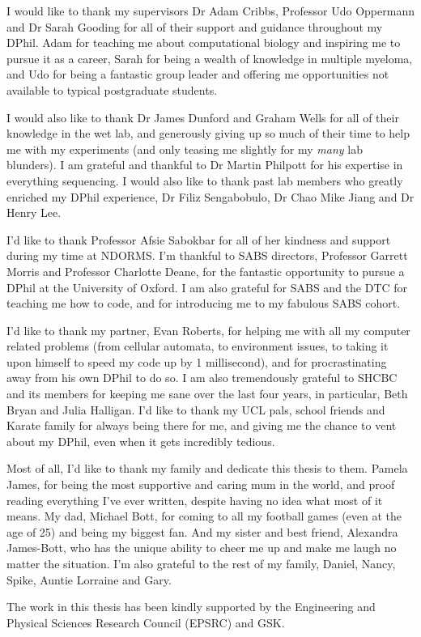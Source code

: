 I would like to thank my supervisors Dr Adam Cribbs, Professor Udo Oppermann and Dr Sarah Gooding for all of their support and guidance throughout my DPhil.
Adam for teaching me about computational biology and inspiring me to pursue it as a career, Sarah for being a wealth of knowledge in multiple myeloma, and Udo for being a fantastic group leader and offering me opportunities not available to typical postgraduate students.  

I would also like to thank Dr James Dunford and Graham Wells for all of their knowledge in the wet lab, and generously giving up so much of their time to help me with my experiments (and only teasing me slightly for my \textit{many} lab blunders).
I am grateful and thankful to Dr Martin Philpott for his expertise in everything sequencing.
I would also like to thank past lab members who greatly enriched my DPhil experience, Dr Filiz Sengabobulo, Dr Chao Mike Jiang and Dr Henry Lee.

I'd like to thank Professor Afsie Sabokbar for all of her kindness and support during my time at NDORMS. 
I'm thankful to SABS directors, Professor Garrett Morris and Professor Charlotte Deane, for the fantastic opportunity to pursue a DPhil at the University of Oxford. 
I am also grateful for SABS and the DTC for teaching me how to code, and for introducing me to my fabulous SABS cohort. 

I'd like to thank my partner, Evan Roberts, for helping me with all my computer related problems (from cellular automata, to environment issues, to taking it upon himself to speed my code up by 1 millisecond), and for procrastinating away from his own DPhil to do so. 
I am also tremendously grateful to SHCBC and its members for keeping me sane over the last four years, in particular, Beth Bryan and Julia Halligan.
I'd like to thank my UCL pals, school friends and Karate family for always being there for me, and giving me the chance to vent about my DPhil, even when it gets incredibly tedious. 

Most of all, I'd like to thank my family and dedicate this thesis to them.
Pamela James, for being the most supportive and caring mum in the world, and proof reading everything I've ever written, despite having no idea what most of it means.
My dad, Michael Bott, for coming to all my football games (even at the age of 25) and being my biggest fan.
And my sister and best friend, Alexandra James-Bott, who has the unique ability to cheer me up and make me laugh no matter the situation.
I'm also grateful to the rest of my family, Daniel, Nancy, Spike, Auntie Lorraine and Gary.

The work in this thesis has been kindly supported by the Engineering and Physical Sciences Research Council (EPSRC) and GSK.